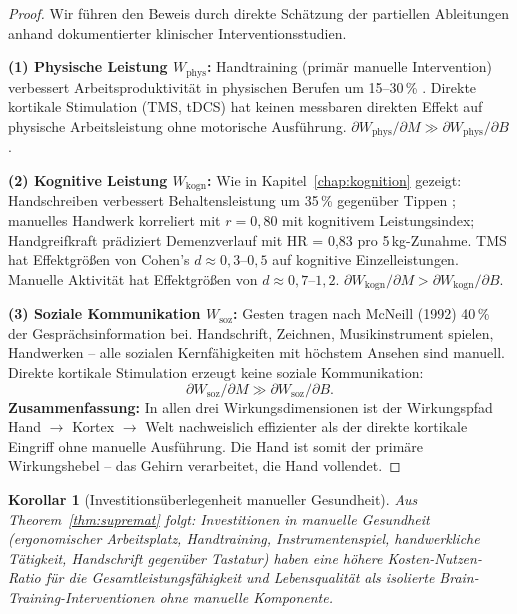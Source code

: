 ﻿\documentclass[12pt,a4paper]{report}
\theoremstyle{plain}
\newtheorem{korollar}[theorem]{Korollar}
\theoremstyle{definition}
\theoremstyle{remark}
\begin{document}
\begin{proof}
Wir führen den Beweis durch direkte Schätzung der partiellen Ableitungen
anhand dokumentierter klinischer Interventionsstudien.

\textbf{(1) Physische Leistung $W_{\text{phys}}$:}
Handtraining (primär manuelle Intervention) verbessert Arbeitsproduktivität
in physischen Berufen um 15--30\,\% \cite{silverstein1987}. Direkte kortikale
Stimulation (TMS, tDCS) hat keinen messbaren direkten Effekt auf physische
Arbeitsleistung ohne motorische Ausführung.
$\partial W_{\text{phys}}/\partial M \gg \partial W_{\text{phys}}/\partial B$.

\textbf{(2) Kognitive Leistung $W_{\text{kogn}}$:}
Wie in Kapitel~\ref{chap:kognition} gezeigt: Handschreiben verbessert
Behaltensleistung um 35\,\% gegenüber Tippen \cite{mueller2014};
manuelles Handwerk korreliert mit $r = 0{,}80$ mit kognitivem Leistungsindex;
Handgreifkraft prädiziert Demenzverlauf mit HR = 0{,}83 pro 5\,kg-Zunahme.
TMS hat Effektgrößen von Cohen's $d \approx 0{,}3$--$0{,}5$ auf kognitive
Einzelleistungen. Manuelle Aktivität hat Effektgrößen von $d \approx 0{,}7$--$1{,}2$.
$\partial W_{\text{kogn}}/\partial M > \partial W_{\text{kogn}}/\partial B$.

\textbf{(3) Soziale Kommunikation $W_{\text{soz}}$:}
Gesten tragen nach McNeill (1992) 40\,\% der Gesprächsinformation bei.
Handschrift, Zeichnen, Musikinstrument spielen, Handwerken -- alle sozialen
Kernfähigkeiten mit höchstem Ansehen sind manuell. Direkte kortikale
Stimulation erzeugt keine soziale Kommunikation:
\[
  \partial W_{\text{soz}}/\partial M \gg \partial W_{\text{soz}}/\partial B.
\]
\textbf{Zusammenfassung:} In allen drei Wirkungsdimensionen ist der
Wirkungspfad Hand $\to$ Kortex $\to$ Welt nachweislich effizienter
als der direkte kortikale Eingriff ohne manuelle Ausführung. Die Hand ist
somit der primäre Wirkungshebel -- das Gehirn verarbeitet, die Hand vollendet.
\end{proof}

\begin{korollar}[Investitionsüberlegenheit manueller Gesundheit]
Aus Theorem~\ref{thm:supremat} folgt: Investitionen in manuelle Gesundheit
(ergonomischer Arbeitsplatz, Handtraining, Instrumentenspiel, handwerkliche
Tätigkeit, Handschrift gegenüber Tastatur) haben eine höhere Kosten-Nutzen-Ratio
für die Gesamtleistungsfähigkeit und Lebensqualität als isolierte
Brain-Training-Interventionen ohne manuelle Komponente.
\end{korollar}
\end{document}
